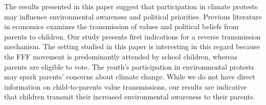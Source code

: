 The results presented in this paper suggest that participation in climate protests may influence environmental awareness and political priorities. Previous literature in economics examines the transmission of values and political beliefs from parents to children. Our study presents first indications for a reverse transmission mechanism. The setting studied in this paper is interesting in this regard because the FFF movement is predominantly attended by school children, whereas parents are eligible to vote. The youth's participation in environmental protests may spark parents' concerns about climate change. While we do not have direct information on child-to-parents value transmissions, our results are indicative that children transmit their increased environmental awareness to their parents.









